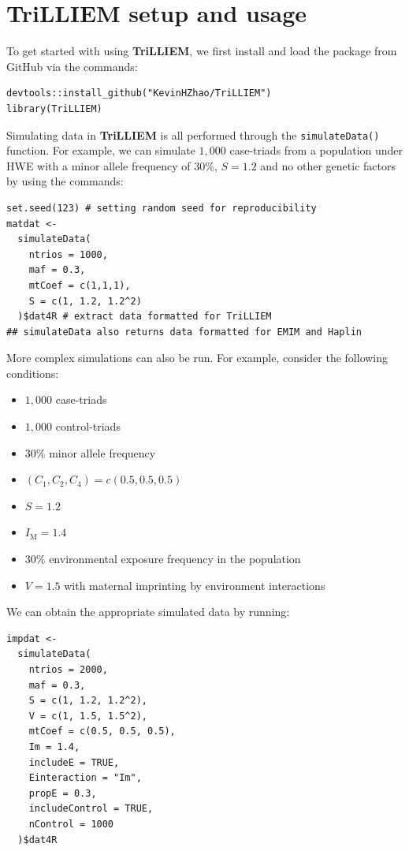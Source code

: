 \section{TriLLIEM setup and usage}

To get started with using \textbf{TriLLIEM}, we first install and load the package from GitHub via the commands:
\begin{verbatim}
devtools::install_github("KevinHZhao/TriLLIEM")
library(TriLLIEM)
\end{verbatim}
Simulating data in \textbf{TriLLIEM} is all performed through the \texttt{simulateData()} function.
For example, we can simulate $1,000$ case-triads from a population under HWE with a minor allele frequency of $30\%$, $S = 1.2$ and no other genetic factors by using the commands:
\begin{verbatim}
set.seed(123) # setting random seed for reproducibility
matdat <- 
  simulateData(
    ntrios = 1000,
    maf = 0.3,
    mtCoef = c(1,1,1),
    S = c(1, 1.2, 1.2^2)
  )$dat4R # extract data formatted for TriLLIEM
## simulateData also returns data formatted for EMIM and Haplin
\end{verbatim}
More complex simulations can also be run.
For example, consider the following conditions:
\begin{itemize}
  \item $1,000$ case-triads
  \item $1,000$ control-triads
  \item $30\%$ minor allele frequency
  \item $(C_1, C_2, C_4) = c(0.5,0.5,0.5)$
  \item $S=1.2$
  \item $I_{\textrm{M}} = 1.4$
  \item $30\%$ environmental exposure frequency in the population
  \item $V = 1.5$ with maternal imprinting by environment interactions
\end{itemize}
We can obtain the appropriate simulated data by running:
\begin{verbatim}
impdat <-
  simulateData(
    ntrios = 2000,
    maf = 0.3,
    S = c(1, 1.2, 1.2^2),
    V = c(1, 1.5, 1.5^2),
    mtCoef = c(0.5, 0.5, 0.5),
    Im = 1.4,
    includeE = TRUE,
    Einteraction = "Im",
    propE = 0.3,
    includeControl = TRUE,
    nControl = 1000
  )$dat4R
\end{verbatim}

